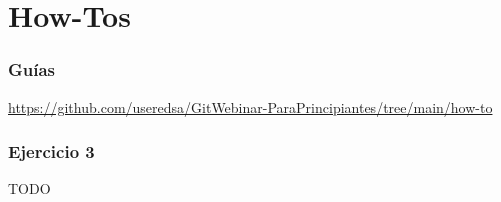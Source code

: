\section{How-Tos}

\begin{frame}\frametitle{Guías}
\url{https://github.com/useredsa/GitWebinar-ParaPrincipiantes/tree/main/how-to}
\end{frame}

\begin{frame}\frametitle{Ejercicio 3}
TODO
\end{frame}

